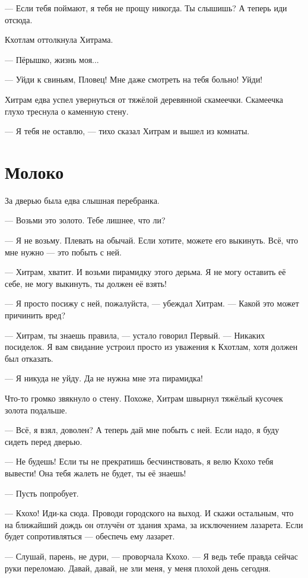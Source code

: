 --- Если тебя поймают, я тебя не прощу никогда.
Ты слышишь?
А теперь иди отсюда.

Кхотлам оттолкнула Хитрама.

--- Пёрышко, жизнь моя...

--- Уйди к свиньям, Пловец!
Мне даже смотреть на тебя больно!
Уйди!

Хитрам едва успел увернуться от тяжёлой деревянной скамеечки.
Скамеечка глухо треснула о каменную стену.

--- Я тебя не оставлю, --- тихо сказал Хитрам и вышел из комнаты.

\section{Молоко}

За дверью была едва слышная перебранка.

--- Возьми это золото.
Тебе лишнее, что ли?

--- Я не возьму.
Плевать на обычай.
Если хотите, можете его выкинуть.
Всё, что мне нужно --- это побыть с ней.

--- Хитрам, хватит.
И возьми пирамидку этого дерьма.
Я не могу оставить её себе, не могу выкинуть, ты должен её взять!

--- Я просто посижу с ней, пожалуйста, --- убеждал Хитрам.
--- Какой это может причинить вред?

--- Хитрам, ты знаешь правила, --- устало говорил Первый.
--- Никаких посиделок.
Я вам свидание устроил просто из уважения к Кхотлам, хотя должен был отказать.

--- Я никуда не уйду.
Да не нужна мне эта пирамидка!

Что-то громко звякнуло о стену.
Похоже, Хитрам швырнул тяжёлый кусочек золота подальше.

--- Всё, я взял, доволен?
А теперь дай мне побыть с ней.
Если надо, я буду сидеть перед дверью.

--- Не будешь!
Если ты не прекратишь бесчинствовать, я велю Кхохо тебя вывести!
Она тебя жалеть не будет, ты её знаешь!

--- Пусть попробует.

--- Кхохо!
Иди-ка сюда.
Проводи городского на выход.
И скажи остальным, что на ближайший дождь он отлучён от здания храма, за исключением лазарета.
Если будет сопротивляться --- обеспечь ему лазарет.

--- Слушай, парень, не дури, --- проворчала Кхохо.
--- Я ведь тебе правда сейчас руки переломаю.
Давай, давай, не зли меня, у меня плохой день сегодня.

